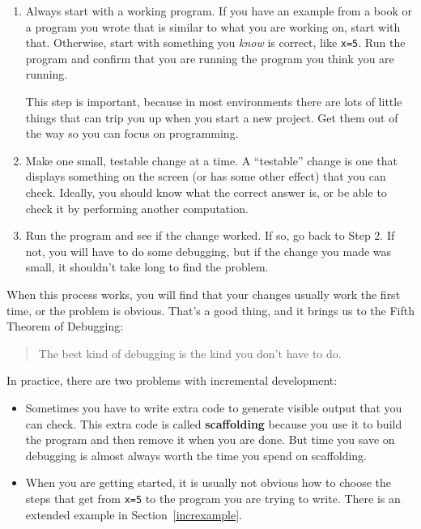 \documentclass{book}
\begin{document}
\begin{enumerate}

\item Always start with a working program. If you have an
example from a book or a program you wrote that is similar to
what you are working on, start with that. Otherwise, start with
something you {\em know} is correct, like {\tt x=5}. Run the program
and confirm that you are running the program you think you are
running.

This step is important, because in most environments there
are lots of little things that can trip you up when you start a new
project. Get them out of the way so you can focus on programming.

\item Make one small, testable change at a time. A ``testable''
change is one that displays something on the screen (or has some
other effect) that you can check. Ideally, you should know what
the correct answer is, or be able to check it by performing another
computation. 

\item Run the program and see if the change worked. If so, go back
to Step 2. If not, you will have to do some debugging, but if the
change you made was small, it shouldn't take long to find the problem.

\end{enumerate}

When this process works, you will find that your changes usually
work the first time, or the problem is obvious. That's a good thing,
and it brings us to the Fifth Theorem of Debugging:

\begin{quote}
The best kind of debugging is the kind you don't have to do.
\end{quote}

In practice, there are two problems with incremental development:

\begin{itemize}

\item Sometimes you have to write extra code to
generate visible output that you can check. This extra code is
called {\bf scaffolding} because you use it to build the program
and then remove it when you are done. But time you save on
debugging is almost always worth the time you spend on
scaffolding.

\item When you are getting started, it is usually not obvious how to
choose the steps that get from {\tt x=5} to the program you are trying
to write. There is an extended example in Section~\ref{increxample}.

\end{itemize}
\end{document}

